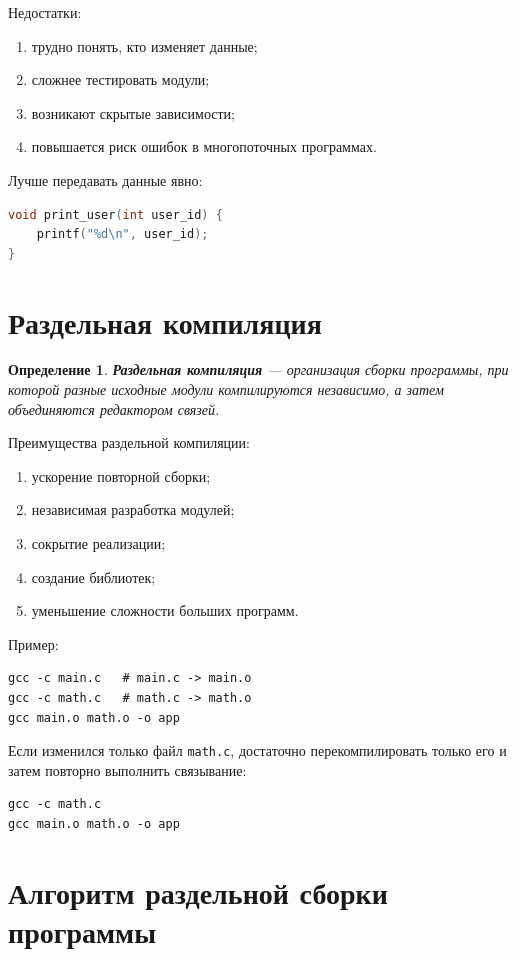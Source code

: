 \documentclass[12pt,a4paper]{article}
\newtheorem{definition}{Определение}
\begin{document}
Недостатки:
\begin{enumerate}
  \item трудно понять, кто изменяет данные;
  \item сложнее тестировать модули;
  \item возникают скрытые зависимости;
  \item повышается риск ошибок в многопоточных программах.
\end{enumerate}

Лучше передавать данные явно:

\begin{lstlisting}[language=C]
void print_user(int user_id) {
    printf("%d\n", user_id);
}
\end{lstlisting}

\section{Раздельная компиляция}

\begin{definition}
\textbf{Раздельная компиляция} --- организация сборки программы, при которой разные исходные модули компилируются независимо, а затем объединяются редактором связей.
\end{definition}

Преимущества раздельной компиляции:
\begin{enumerate}
  \item ускорение повторной сборки;
  \item независимая разработка модулей;
  \item сокрытие реализации;
  \item создание библиотек;
  \item уменьшение сложности больших программ.
\end{enumerate}

Пример:

\begin{lstlisting}
gcc -c main.c   # main.c -> main.o
gcc -c math.c   # math.c -> math.o
gcc main.o math.o -o app
\end{lstlisting}

Если изменился только файл \texttt{math.c}, достаточно перекомпилировать только его и затем повторно выполнить связывание:

\begin{lstlisting}
gcc -c math.c
gcc main.o math.o -o app
\end{lstlisting}

\section{Алгоритм раздельной сборки программы}
\end{document}

